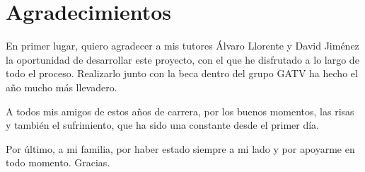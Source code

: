 \newpage
\thispagestyle{fancy}

\chapter*{Agradecimientos}

En primer lugar, quiero agradecer a mis tutores Álvaro Llorente y David Jiménez
la oportunidad de desarrollar este proyecto, con el que he disfrutado a lo largo
de todo el proceso. Realizarlo junto con la beca dentro del grupo GATV ha hecho
el año mucho más llevadero.

A todos mis amigos de estos años de carrera, por los buenos momentos, las risas
y también el sufrimiento, que ha sido una constante desde el primer día.

Por último, a mi familia, por haber estado siempre a mi lado y por apoyarme
en todo momento. Gracias.

\newpage
